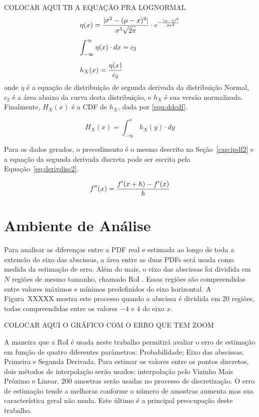 \color{red} COLOCAR AQUI TB A EQUAÇÃO PRA LOGNORMAL \color{black}
\begin{equation}
\begin{array}{l}
\vspace{0.3cm}\displaystyle \eta(x) = \frac{|\sigma^2 - (\mu - x)^2|}{ \sigma^5\sqrt{2\pi}}\cdot e^{-\frac{(\mu - x)^2}{2 \sigma^2}} \\
\vspace{0.3cm} \displaystyle \int_{-\infty}^{\infty} \eta(x)\cdot dx = c_2 \\
\displaystyle h_X(x) = \frac{\eta(x)}{c_2}
\label{equ:hx}
\end{array}
\end{equation}
onde $\eta$ é a equação de distribuição de segunda derivada da distribuição Normal, $c_2$ é a área abaixo da curva desta distribuição, e $h_X$ é sua versão normalizada. 
Finalmente, $H_X(x)$ é a \ac{CDF} de $h_X$, dada por \eqref{equ:ddcdf}.

\begin{equation}
H_X(x) = \int_{-\infty}^x h_X(y)\cdot dy
\label{equ:ddcdf}
\end{equation}

Para os dados gerados, o precedimento é o mesmo descrito na Seção~\ref{cap:ipdf2} e a equação da segunda derivada discreta pode ser escrita pela Equação~\ref{eq:derivdisc2}.

\begin{equation}
{\displaystyle f''(x) = {f'(x+h)-f'(x) \over h}}
\label{eq:derivdisc2}
\end{equation}

\section{Ambiente de Análise}
Para analisar as diferenças entre a \ac{PDF} real e estimada ao longo de toda a extensão do eixo das abscissas, a área entre as duas \ac{PDF}s será usada como medida da estimação de erro. Além do mais, o eixo das abscissas foi dividida em $N$ regiões de mesmo tamanho, chamado \ac{RoI} \cite{ron1999art}. Essas regiões são compreendidas entre valores máximos e mínimos predefinidos do eixo horizontal. A Figura~XXXXX mostra este processo quando a abscissa é dividida em 20 regiões, todas compreendidas entre os valores $-4$ e $4$ do eixo $ x $.


{\color{red} COLOCAR AQUI O GRÁFICO COM O ERRO QUE TEM ZOOM}

A maneira que a \ac{RoI} é usada neste trabalho permitirá avaliar o erro de estimação em função de quatro diferentes parâmetros: Probabilidade; Eixo das abscissas; Primeira e Segunda Derivada. Para estimar os valores entre os pontos discretos, dois métodos de interpolação serão usados: interpolação pelo Vizinho Mais Próximo e Linear. 200 amostras serão usadas no processo de discretização. O erro de estimação tende a melhoras conforme o número de amostras aumenta mas sua característica geral não muda. Este último é a principal preocupação deste trabalho.